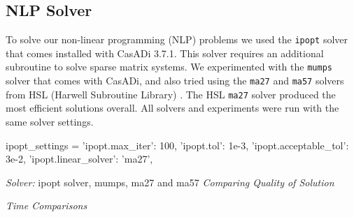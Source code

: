 \documentclass[]{article}
\begin{document}
	\subsection*{NLP Solver}
	To solve our non-linear programming (NLP) problems we used the \texttt{ipopt} solver that comes installed with CasADi 3.7.1.  This solver requires an additional subroutine to  solve sparse matrix systems. We experimented with the \texttt{mumps}  solver that comes with CasADi, and also tried using the  \texttt{ma27} and  \texttt{ma57} solvers  from HSL (Harwell Subroutine Library) \cite{hsl}. The HSL \texttt{ma27} solver produced the most efficient solutions overall. All solvers and experiments were run with the same solver settings.
	\vspace{\baselineskip}
	\begin{python}
        ipopt_settings = {
			'ipopt.max_iter': 100,                  
			'ipopt.tol': 1e-3,                      	
			'ipopt.acceptable_tol': 3e-2,
			'ipopt.linear_solver': 'ma27',
		}
	\end{python}
	

	
	
	 {\em Solver:} ipopt solver, mumps, ma27 and ma57
	{\em Comparing Quality of Solution}  

	
	{\em Time Comparisons} 
	
\end{document}
